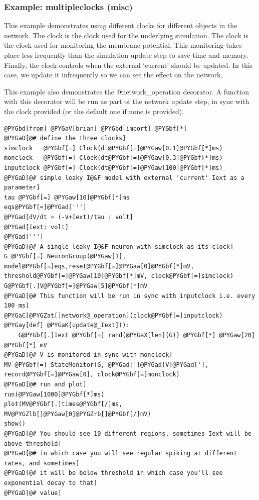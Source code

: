 \documentclass[letterpaper,10pt,english]{manual}
\begin{document}
\resetcurrentobjects
\hypertarget{--doc-examples-misc_multipleclocks}{}

\hypertarget{index-71}{}\subsubsection{Example: multipleclocks (misc)}

This example demonstrates using different clocks for different objects
in the network. The clock  is the clock used for the
underlying simulation. The clock  is the clock used for
monitoring the membrane potential. This monitoring takes place less
frequently than the simulation update step to save time and memory.
Finally, the clock  controls when the external `current'
 should be updated. In this  case, we update it infrequently
so we can see the effect on the network.

This example also demonstrates the @network\_operation decorator. A
function with this decorator will be run as part of the network
update step, in sync with the clock provided (or the default one
if none is provided).

\begin{Verbatim}[commandchars=@\[\]]
@PYGbd[from] @PYGaV[brian] @PYGbd[import] @PYGbf[*]
@PYGaD[@# define the three clocks]
simclock   @PYGbf[=] Clock(dt@PYGbf[=]@PYGaw[0.1]@PYGbf[*]ms)
monclock   @PYGbf[=] Clock(dt@PYGbf[=]@PYGaw[0.3]@PYGbf[*]ms)
inputclock @PYGbf[=] Clock(dt@PYGbf[=]@PYGaw[100]@PYGbf[*]ms)
@PYGaD[@# simple leaky I@&F model with external 'current' Iext as a parameter]
tau @PYGbf[=] @PYGaw[10]@PYGbf[*]ms
eqs@PYGbf[=]@PYGad[''']
@PYGad[dV/dt = (-V+Iext)/tau : volt]
@PYGad[Iext: volt]
@PYGad[''']
@PYGaD[@# A single leaky I@&F neuron with simclock as its clock]
G @PYGbf[=] NeuronGroup(@PYGaw[1], model@PYGbf[=]eqs,reset@PYGbf[=]@PYGaw[0]@PYGbf[*]mV, threshold@PYGbf[=]@PYGaw[10]@PYGbf[*]mV, clock@PYGbf[=]simclock)
G@PYGbf[.]V@PYGbf[=]@PYGaw[5]@PYGbf[*]mV
@PYGaD[@# This function will be run in sync with inputclock i.e. every 100 ms]
@PYGaC[@PYGZat[]network@_operation](clock@PYGbf[=]inputclock)
@PYGay[def] @PYGaK[update@_Iext]():
    G@PYGbf[.]Iext @PYGbf[=] rand(@PYGaX[len](G)) @PYGbf[*] @PYGaw[20] @PYGbf[*] mV
@PYGaD[@# V is monitored in sync with monclock]
MV @PYGbf[=] StateMonitor(G, @PYGad[']@PYGad[V]@PYGad['], record@PYGbf[=]@PYGaw[0], clock@PYGbf[=]monclock)
@PYGaD[@# run and plot]
run(@PYGaw[1000]@PYGbf[*]ms)
plot(MV@PYGbf[.]times@PYGbf[/]ms, MV@PYGZlb[]@PYGaw[0]@PYGZrb[]@PYGbf[/]mV)
show()
@PYGaD[@# You should see 10 different regions, sometimes Iext will be above threshold]
@PYGaD[@# in which case you will see regular spiking at different rates, and sometimes]
@PYGaD[@# it will be below threshold in which case you'll see exponential decay to that]
@PYGaD[@# value]
\end{Verbatim}
\end{document}
